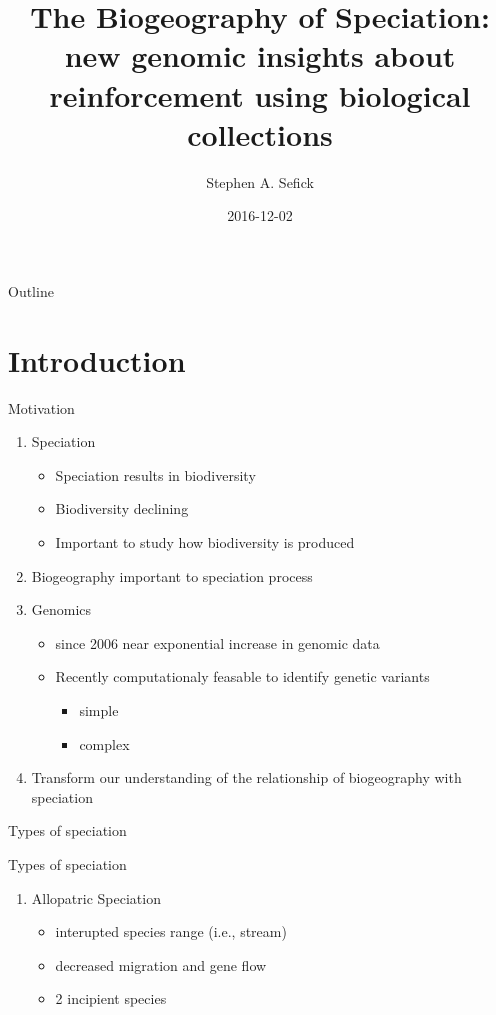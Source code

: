\documentclass[t,10pt]{beamer}
\author{Stephen A. Sefick}
\date{2016-12-02}
\title{The Biogeography of Speciation: new genomic insights about reinforcement using biological collections}
\begin{document}
\maketitle
\begin{frame}{Outline}
\tableofcontents
\end{frame}



\section{Introduction}
\label{sec:orgheadline32}
\begin{frame}[<+->][label={sec:orgheadline1}]{Motivation}
\begin{enumerate}
\item Speciation
\begin{itemize}
\item Speciation results in biodiversity
\item Biodiversity declining
\item \alert{Important to study how biodiversity is produced} \vspace{0.25in}
\end{itemize}
\item Biogeography important to speciation process \vspace{0.25in}
\item Genomics
\begin{itemize}
\item since 2006 near exponential increase in genomic data
\item Recently computationaly feasable to identify genetic variants 
\begin{itemize}
\item simple
\item complex \vspace{0.25in}
\end{itemize}
\end{itemize}
\item \alert{Transform our understanding of the relationship of biogeography with speciation}
\end{enumerate}
\end{frame}

\begin{frame}[label={sec:orgheadline2}]{Types of speciation}
\end{frame}
\begin{frame}[label={sec:orgheadline3}]{Types of speciation}
\begin{enumerate}[<+->]
\item Allopatric Speciation
\begin{itemize}
\item interupted species range (i.e., stream)
\item decreased migration and gene flow
\item 2 incipient species \vspace{0.25in}
\end{itemize}
\end{enumerate}
\end{frame}
\end{document}
